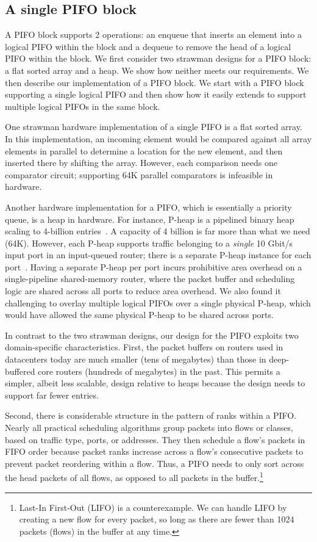 \subsection{A single PIFO block}
\label{ss:single_block}

A PIFO block supports 2 operations: an enqueue that inserts an element into a
logical PIFO within the block and a dequeue to remove the head of a logical
PIFO within the block.  We first consider two strawman designs for a PIFO
block: a flat sorted array and a heap.  We show how neither meets our
requirements. We then describe our implementation of a PIFO block. We start
with a PIFO block supporting a single logical PIFO and then show how it easily
extends to support multiple logical PIFOs in the same block.

One strawman hardware implementation of a single PIFO is a flat sorted array.
In this implementation, an incoming element would be compared against all array
elements in parallel to determine a location for the new element, and then
inserted there by shifting the array.  However, each comparison needs one
comparator circuit; supporting 64K parallel comparators is infeasible in
hardware.

Another hardware implementation for a PIFO, which is essentially a priority
queue, is a heap in hardware. For instance, P-heap is a pipelined binary heap
scaling to 4-billion entries~\cite{bhagwan, pheap}. A capacity of 4 billion is
far more than what we need (64K).  However, each P-heap supports traffic
belonging to a {\em single} 10 Gbit/s input port in an input-queued router;
there is a separate P-heap instance for each port~\cite{bhagwan}.  Having a
separate P-heap per port incurs prohibitive area overhead on a single-pipeline
shared-memory router, where the packet buffer and scheduling logic are shared
across all ports to reduce area overhead.  We also found it challenging to
overlay multiple logical PIFOs over a single physical P-heap, which would have
allowed the same physical P-heap to be shared across ports.

In contrast to the two strawman designs, our design for the PIFO exploits two
domain-specific characteristics. First, the packet buffers on routers used in
datacenters today are much smaller (tens of megabytes) than those in
deep-buffered core routers (hundreds of megabytes) in the past.  This permits a
simpler, albeit less scalable, design relative to heaps because the design
needs to support far fewer entries.

Second, there is considerable structure in the pattern of ranks within a PIFO.
Nearly all practical scheduling algorithms group packets into flows or classes,
\eg based on traffic type, ports, or addresses. They then schedule a flow's
packets in FIFO order because packet ranks increase across a flow's consecutive
packets to prevent packet reordering within a flow. Thus, a PIFO needs to only
sort across the head packets of all flows, as opposed to all packets in the
buffer.\footnote{Last-In First-Out (LIFO) is a counterexample.  We can handle
LIFO by creating a new flow for every packet, so long as there are fewer than
1024 packets (flows) in the buffer at any time.}

